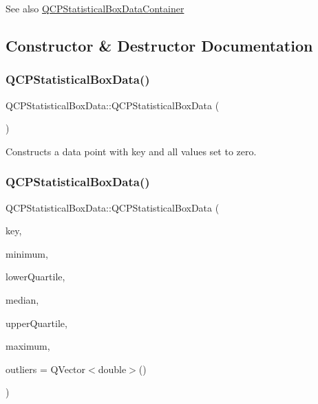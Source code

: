 \begin{DoxySeeAlso}{See also}
\mbox{\hyperlink{qcustomplot_8h_a8b773c0c35f8f924701ced6e9915e4c7}{Q\+C\+P\+Statistical\+Box\+Data\+Container}} 
\end{DoxySeeAlso}


\subsection{Constructor \& Destructor Documentation}
\mbox{\label{class_q_c_p_statistical_box_data_ab96c4b93670a8dcac8a3d4080fd722ee}} 
\subsubsection{\texorpdfstring{QCPStatisticalBoxData()}{QCPStatisticalBoxData()}\hspace{0.1cm}{\footnotesize\ttfamily [1/2]}}
{\footnotesize\ttfamily Q\+C\+P\+Statistical\+Box\+Data\+::\+Q\+C\+P\+Statistical\+Box\+Data (\begin{DoxyParamCaption}{ }\end{DoxyParamCaption})}

Constructs a data point with key and all values set to zero. \mbox{\label{class_q_c_p_statistical_box_data_a66b0c6d39765d0feb49c286fba4e4ef5}} 
\subsubsection{\texorpdfstring{QCPStatisticalBoxData()}{QCPStatisticalBoxData()}\hspace{0.1cm}{\footnotesize\ttfamily [2/2]}}
{\footnotesize\ttfamily Q\+C\+P\+Statistical\+Box\+Data\+::\+Q\+C\+P\+Statistical\+Box\+Data (\begin{DoxyParamCaption}\item[{double}]{key,  }\item[{double}]{minimum,  }\item[{double}]{lower\+Quartile,  }\item[{double}]{median,  }\item[{double}]{upper\+Quartile,  }\item[{double}]{maximum,  }\item[{const Q\+Vector$<$ double $>$ \&}]{outliers = {\ttfamily QVector$<$double$>$()} }\end{DoxyParamCaption})}

